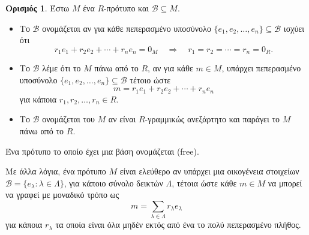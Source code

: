 \documentclass[12pt,a4paper,reqno]{amsart}
\theoremstyle{definition}
\newtheorem{definition}[theorem]{Ορισμός}
\theoremstyle{remark}
\numberwithin{theorem}{section}
\numberwithin{exercise}{section}
\numberwithin{equation}{section}
\newcommand{\bB}{\mathcal{B}}
\newcommand{\then}{\Rightarrow}
\newcommand{\defn}[1]{{\color{mylightblue}{#1}}}
\begin{document}
\begin{definition}
    \label{def:free_modules}
    Έστω $M$ ένα $R$-πρότυπο και $\bB \subseteq M$.
    \begin{itemize}
        \item Το $\bB$ ονομάζεται \defn{$R$-γραμμικώς ανεξάρτητο} αν για κάθε πεπερασμένο υποσύνολο $\{e_1, e_2, \dots, e_n\} \subseteq \bB$ ισχύει ότι 
        \[
        r_1e_1 + r_2e_2 + \cdots + r_ne_n = 0_M \quad \then \quad r_1 = r_2 = \cdots = r_n = 0_R.
        \]
        \item Το $\bB$ λέμε ότι \defn{παράγει} το $M$ πάνω από το $R$, αν για κάθε $m \in M$, υπάρχει πεπερασμένο υποσύνολο $\{e_1, e_2, \dots, e_n\} \subseteq \bB$ τέτοιο ώστε 
        \[
        m = r_1e_1 + r_2e_2 + \cdots + r_ne_n
        \]
        για κάποια $r_1, r_2, \dots, r_n \in R$.
        \item Το $\bB$ ονομάζεται \defn{βάση} του $M$ αν είναι $R$-γραμμικώς ανεξάρτητο και παράγει το $M$ πάνω από το $R$.
    \end{itemize}
    Ένα πρότυπο το οποίο έχει μια βάση ονομάζεται \defn{ελεύθερο} (free).
\end{definition}

Με άλλα λόγια, ένα πρότυπο $M$ είναι ελεύθερο αν υπάρχει μια οικογένεια στοιχείων $\bB = \{e_\lambda : \lambda \in \Lambda\}$, για κάποιο σύνολο δεικτών $\Lambda$, τέτοια ώστε κάθε $m \in M$ να μπορεί να γραφεί με μοναδικό τρόπο ως 
\[
m = \sum_{\lambda \in \Lambda} r_\lambda e_\lambda
\]
για κάποια $r_\lambda$ τα οποία είναι όλα μηδέν εκτός από ένα το πολύ πεπερασμένο πλήθος.
\end{document}
